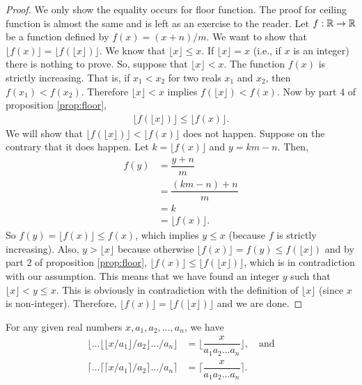 \documentclass[12pt]{subfile}
\begin{document}
\begin{proof}
	We only show the equality occurs for floor function. The proof for ceiling function is almost the same and is left as an exercise to the reader. Let $f: \mathbb{R} \to \mathbb{R}$ be a function defined by $f(x)=(x+n)/m$. We want to show that $\lfloor f(x) \rfloor = \lfloor f(\lfloor x \rfloor) \rfloor$. We know that $\lfloor x \rfloor \leq x$. If $\lfloor x \rfloor = x$ (i.e., if $x$ is an integer) there is nothing to prove. So, suppose that $\lfloor x \rfloor < x$. The function $f(x)$ is strictly increasing. That is, if $x_1<x_2$ for two reals $x_1$ and $x_2$, then $f(x_1) < f(x_2)$. Therefore $\lfloor x \rfloor < x$ implies $f(\lfloor x \rfloor) < f(x)$. Now by part $4$ of proposition \eqref{prop:floor},
	\begin{align*}
	\bigg\lfloor f(\lfloor x \rfloor)\bigg\rfloor  \leq \bigg\lfloor f(x) \bigg\rfloor.
	\end{align*}
	We will show that $\lfloor f(\lfloor x \rfloor)\rfloor  < \lfloor f(x) \rfloor$ does not happen. Suppose on the contrary that it does happen. Let $k =  \lfloor f(x) \rfloor$ and $y=km-n$. Then,
	\begin{align*}
	f(y) &= \dfrac{y+n}{m}\\
	&= \dfrac{(km-n)+n}{m}\\
	&= k\\
	&= \lfloor f(x) \rfloor.
	\end{align*}
	So $f(y)=\lfloor f(x) \rfloor \leq f(x)$, which implies $y \leq x$ (because $f$ is strictly increasing). Also, $y > \lfloor x \rfloor$ because otherwise $\lfloor f(x) \rfloor = f(y) \leq  f(\lfloor x \rfloor)$ and by part $2$ of proposition \eqref{prop:floor}, $\lfloor f(x) \rfloor \leq \lfloor f(\lfloor x \rfloor)\rfloor$, which is in contradiction with our assumption. This means that we have found an integer $y$ such that $\lfloor x \rfloor < y \leq x$. This is obviously in contradiction with the definition of $\lfloor x \rfloor$ (since $x$ is non-integer). Therefore, $\lfloor f(x) \rfloor = \lfloor f(\lfloor x \rfloor) \rfloor$ and we are done.
\end{proof}

\begin{corollary}
	For any given real numbers $x, a_1, a_2, \ldots, a_n$, we have
	\begin{align*}
	\Bigg\lfloor \ldots \Big\lfloor \big\lfloor x/a_1 \big\rfloor/a_2 \Big\rfloor \ldots/a_n \Bigg\rfloor &= \Bigg\lfloor \dfrac{x}{a_1a_2\ldots a_n}\Bigg\rfloor, \quad \text{and}\\
	\Bigg\lceil \ldots \Big\lceil \big\lceil x/a_1 \big\rceil/a_2 \Big\rceil \ldots/a_n \Bigg\rceil &= \Bigg\lceil \dfrac{x}{a_1a_2\ldots a_n}\Bigg\rceil.
	\end{align*}
\end{corollary}
\end{document}
